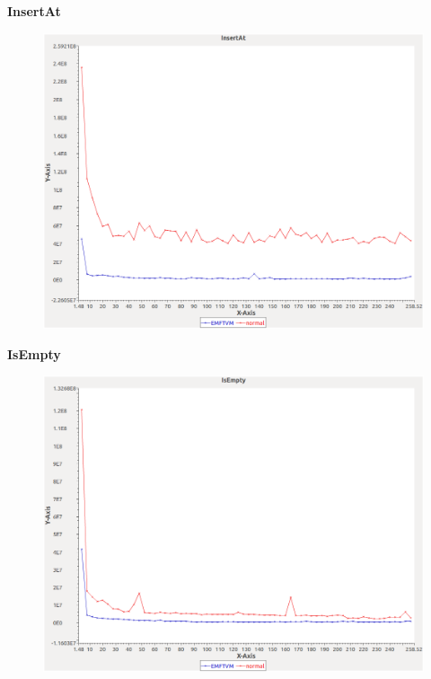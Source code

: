\noindent\textbf{InsertAt}

\begin{figure}[h]
\centering
\includegraphics[width=\textwidth]{../graphs/sequence/InsertAt}
\end{figure}
\pagebreak

\noindent\textbf{IsEmpty}

\begin{figure}[h]
\centering
\includegraphics[width=\textwidth]{../graphs/sequence/IsEmpty}
\end{figure}
\pagebreak


